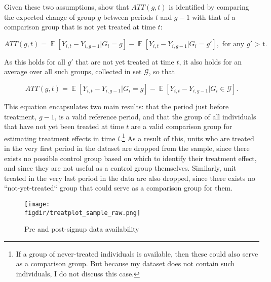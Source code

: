Given these two assumptions, \citet{callaway2021difference} show that
$ATT(g,t)$ is identified by comparing the expected change of group $g$ between
periods $t$ and $g-1$ with that of a comparison group that is not yet treated
at time $t$:

\begin{equation}
    ATT(g,t) = \mathop{\mathbb{E}}[Y_{i,t} - Y_{i,g-1}|G_i = g] -
    \mathop{\mathbb{E}}[Y_{i,t} - Y_{i,g-1}|G_i = g'], \text{ for any $g'$ >
    t}.
\end{equation}

As this holds for all $g'$ that are not yet treated at time $t$, it also holds
for an average over all such groups, collected in set $\mathcal{G}$, so that

\begin{equation}
    ATT(g,t) = \mathop{\mathbb{E}}[Y_{i,t} - Y_{i,g-1}|G_i = g] -
    \mathop{\mathbb{E}}[Y_{i,t} - Y_{i,g-1}|G_i \in \mathcal{G}].
\end{equation}

This equation encapsulates two main results: that the period just before
treatment, $g-1$, is a valid reference period, and that the group of all
individuals that have not yet been treated at time $t$ are a valid comparison
group for estimating treatment effects in time $t$.\footnote{If a group of
never-treated individuals is available, then these could also serve as a
comparison group. But because my dataset does not contain such individuals, I
do not discuss this case.} As a result of this, units who are treated in the
very first period in the dataset are dropped from the sample, since there
exists no possible control group based on which to identify their treatment
effect, and since they are not useful as a control group themselves. Similarly,
unit treated in the very last period in the data are also dropped, since there
exists no ``not-yet-treated`` group that could serve as a comparison group for
them.

\begin{figure}[h]
\centering
\caption{Pre and post-signup data availability}%
\texttt{[image: \\figdir/treatplot\_sample\_raw.png]}
\label{fig:treatplot}
\end{figure}

